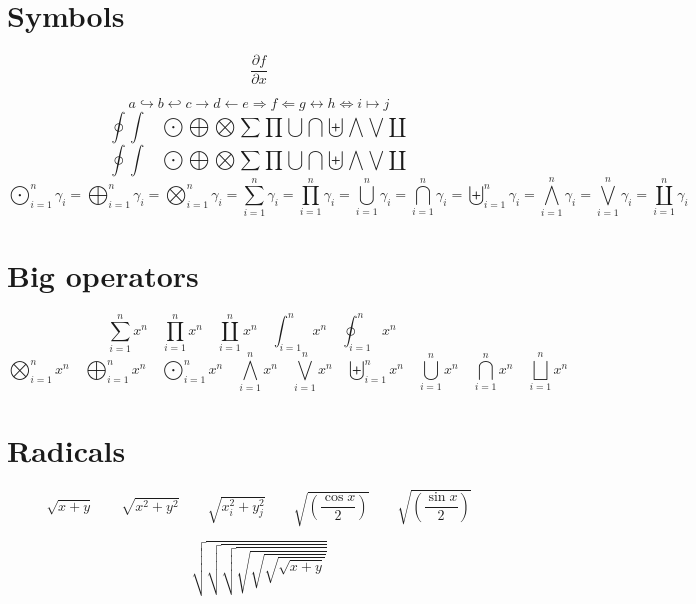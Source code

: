 \documentclass[fleqn]{article}
\begin{document}
\section*{Symbols}

$$ \frac{\partial f}{\partial x} $$

$$
   a \hookrightarrow b \hookleftarrow c \longrightarrow d
   \longleftarrow e \Longrightarrow f \Longleftarrow g
   \longleftrightarrow h \Longleftrightarrow i
   \mapsto j
$$
$$\textstyle
   \oint \int \quad
   \bigodot \bigoplus \bigotimes \sum \prod
   \bigcup \bigcap \biguplus \bigwedge \bigvee \coprod
$$
$$
   \oint \int \quad
   \bigodot \bigoplus \bigotimes \sum \prod
   \bigcup \bigcap \biguplus \bigwedge \bigvee \coprod
$$
$$ \bigodot_{i=1}^n \gamma_i = \bigoplus_{i=1}^n \gamma_i
=\bigotimes_{i=1}^n \gamma_i = \sum_{i=1}^n \gamma_i = \prod_{i=1}^n
\gamma_i = \bigcup_{i=1}^n \gamma_i = \bigcap_{i=1}^n \gamma_i =
\biguplus_{i=1}^n \gamma_i = \bigwedge_{i=1}^n \gamma_i=
\bigvee_{i=1}^n \gamma_i = \coprod_{i=1}^n \gamma_i
$$

\clearpage

\section*{Big operators}

\def\testop#1{#1_{i=1}^{n} x^{n} \quad}
\begin{displaymath}
  \testop\sum
  \testop\prod
  \testop\coprod
  \testop\int
  \testop\oint
\end{displaymath}
\begin{displaymath}
  \testop\bigotimes
  \testop\bigoplus
  \testop\bigodot
  \testop\bigwedge
  \testop\bigvee
  \testop\biguplus
  \testop\bigcup
  \testop\bigcap
  \testop\bigsqcup
\end{displaymath}


\section*{Radicals}

\begin{displaymath}
  \sqrt{x+y} \qquad \sqrt{x^{2}+y^{2}} \qquad
  \sqrt{x_{i}^{2}+y_{j}^{2}} \qquad
  \sqrt{\left(\frac{\cos x}{2}\right)} \qquad
  \sqrt{\left(\frac{\sin x}{2}\right)}
\end{displaymath}

\begingroup
\delimitershortfall-1pt
\begin{displaymath}
  \sqrt{\sqrt{\sqrt{\sqrt{\sqrt{\sqrt{\sqrt{x+y}}}}}}}
\end{displaymath}
\endgroup %
\end{document}
